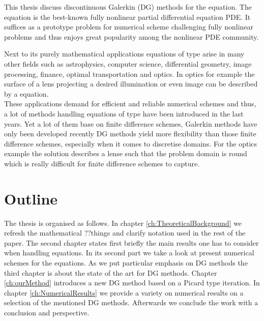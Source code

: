 This thesis discuss discontinuous Galerkin (DG) methods for the \MA equation. 
The \MA equation is the best-known fully nonlinear partial differential equation PDE. It suffices as a prototype problem for numerical scheme challenging fully nonlinear problems and thus enjoys great popularity among the nonlinear PDE community.

Next to its purely mathematical applications equations of \MA type arise in many other fields such as astrophysics, computer science, differential geometry, image processing, finance, optimal transportation and optics\cite{FGN2013}. 
In optics for example the surface of a lens projecting a desired illumination or even image can be described by a \MA equation\cite{KW2010, BHP2014}. \\
These applications demand for efficient and reliable numerical schemes and thus, a lot of methods handling equations of \MA type have been introduced in the last years. Yet a lot of them base on finite difference schemes, Galerkin methods have only been developed recently \cite{Boehmer2008, FN2009a, Awanou2010, BGN+2011, Neilan2014} DG methods yield more flexibility than those finite difference schemes, especially when it comes to discretise domains. For the optics example the solution describes a lense such that the problem domain is round which is really difficult for finite difference schemes to capture.

\section*{Outline}
The thesis is organised as follows. In chapter \ref{ch:TheoreticalBackground} we refresh the mathematical ??things and clarify notation used in the rest of the paper.
The second chapter states first briefly the main results one has to consider when handling \MA equations. In its second part we take a look at present numerical schemes for the \MA equations. As we put particular emphasis on DG methods the third chapter is about the state of the art for DG methods.
Chapter \ref{ch:ourMethod} introduces a new DG method based on a Picard type iteration. In chapter \ref{ch:NumericalResults} we provide a variety on numerical results on a selection of the mentioned DG methods.
Afterwards we conclude the work with a conclusion and perspective.